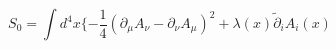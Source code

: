 \begin{equation} 
 S_0= \int d^4x \{- \frac{1}{4}(\partial_{\mu}A_{\nu}- 
 \partial_{\nu}A_{\mu})^2+ \lambda(x) \tilde{\partial}_iA_i(x)
 \label{10} 
\end{equation}

